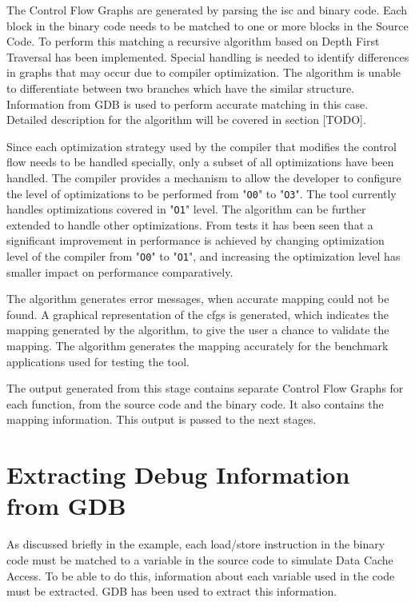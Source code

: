 The Control Flow Graphs are generated by parsing the \gls{isc} and binary code. Each block in the binary code needs to be matched to one or more blocks in the Source Code. To perform this matching a recursive algorithm based on Depth First Traversal has been implemented. Special handling is needed to identify differences in graphs that may occur due to compiler optimization. The algorithm is unable to differentiate between two branches which have the similar structure. Information from GDB is used to perform accurate matching in this case. Detailed description for the algorithm will be covered in section [TODO].

Since each optimization strategy used by the compiler that modifies the control flow needs to be handled specially, only a subset of all optimizations have been handled. The compiler provides a mechanism to allow the developer to configure the level of optimizations to be performed from "\texttt{O0}" to "\texttt{O3}". The tool currently handles optimizations covered in "\texttt{O1}" level. The algorithm can be further extended to handle other optimizations. From tests it has been seen that a significant improvement in performance is achieved by changing optimization level of the compiler from "\texttt{O0}" to "\texttt{O1}", and increasing the optimization level has smaller impact on performance comparatively. 

The algorithm generates error messages, when accurate mapping could not be found. A graphical representation of the \gls{cfg}s is generated, which indicates the mapping generated by the algorithm, to give the user a chance to validate the mapping. The algorithm generates the mapping accurately for the benchmark applications used for testing the tool.

The output generated from this stage contains separate Control Flow Graphs for each function, from the source code and the binary code. It also contains the mapping information. This output is passed to the next stages.

\section{Extracting Debug Information from GDB}
\label{sec:C3GDBInfo}
As discussed briefly in the example, each load/store instruction in the binary code must be matched to a variable in the source code to simulate Data Cache Access. To be able to do this, information about each variable used in the code must be extracted. GDB has been used to extract this information.

